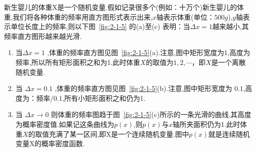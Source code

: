 \begin{example}
	新生婴儿的体重X是一个随机变量.假如记录很多个(例如：十万个)新生婴儿的体重,我们将各种体重的频率用直方图形式表示出来,$x$轴表示体重(单位：$ 500g $),$ y $轴表示单位长度上的频率,则以下图~\ref{fig:2-1-5} 的(a)至(c)
	表明：当$\Delta x=1$越来越小,其频率直方图形越来越光滑.
	
	\begin{enumerate}
		\item 当$\Delta x=1$ ,体重的频率直方图见图~\ref{fig:2-1-5}(a).注意,图中矩形宽度为1,高度为频率,所以所有矩形面积之和为1.此时体重$ X $的取值为$1,2, \cdots $，即$ X $是一个离散随机变量.
		\item 当 $\Delta x=0.1$ ,体重的频率直方图见图~\ref{fig:2-1-5}(b).注意,图中矩形宽度为
		$ 0.1 $,高度为：频率$ /0.1 $,所有小矩形面积之和仍为1.
		\item 当 $\Delta x \rightarrow 0$ 则体重的频率图趋于图~\ref{fig:2-1-5}(c)所示的一条光滑的曲线,其高度为概率密度值.如果记这条曲线为$ p(x) $,则$ p(x) $与$ x $轴所夹面积仍为1.此时体重$ X $的取值充满了某一区间,即X是一个连续随机变量.图中$ p(x) $就是连续随机变量X的概率密度函数.
	\end{enumerate}
	
\end{example}

